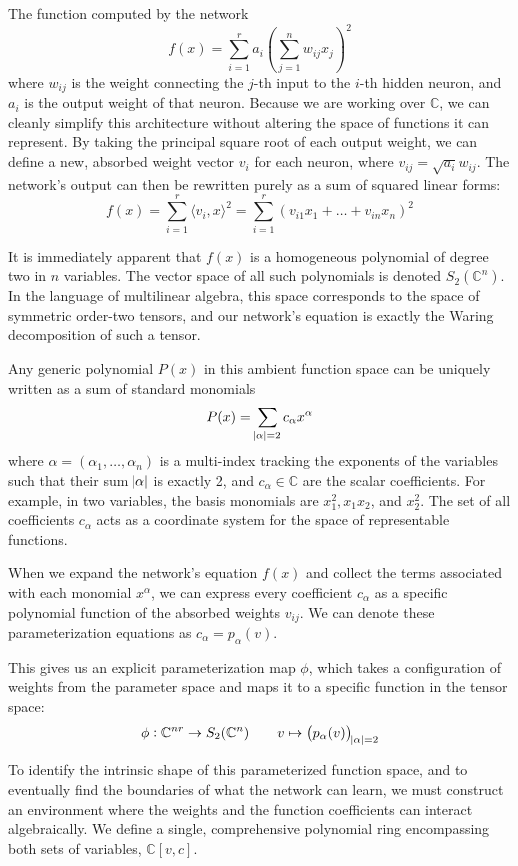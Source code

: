 \documentclass[12pt]{amsproc}
\renewcommand{\-}{\setminus}
\newcommand\<{\langle}
\renewcommand\>{\rangle}
\theoremstyle{plain}
\theoremstyle{definition}
\theoremstyle{remark}
\begin{document}
The function computed by the network
\[
f(x) = \sum_{i=1}^r a_i \left( \sum_{j=1}^n w_{ij} x_j \right)^2
\]
where $w_{ij}$ is the weight connecting the $j$-th input to the $i$-th hidden neuron, and $a_i$ is the output weight of that neuron. Because we are working over $\mathbb{C}$, we can cleanly simplify this architecture without altering the space of functions it can represent. By taking the principal square root of each output weight, we can define a new, absorbed weight vector $v_i$ for each neuron, where $v_{ij} = \sqrt{a_i} w_{ij}$. The network's output can then be rewritten purely as a sum of squared linear forms:
\[
f(x) = \sum_{i=1}^r \langle v_i, x \rangle^2 = \sum_{i=1}^r \left( v_{i1}x_1 + \dots + v_{in}x_n \right)^2
\]

It is immediately apparent that $f(x)$ is a homogeneous polynomial of degree two in $n$ variables. The vector space of all such polynomials is denoted $S_2(\mathbb{C}^n)$. In the language of multilinear algebra, this space corresponds to the space of symmetric order-two tensors, and our network's equation is exactly the Waring decomposition of such a tensor. 

Any generic polynomial $P(x)$ in this ambient function space can be uniquely written as a sum of standard monomials 
\[
P(x) = \sum_{\abs{\alpha} = 2} c_\alpha x^\alpha
\]
where $\alpha = (\alpha_1, \dots, \alpha_n)$ is a multi-index tracking the exponents of the variables such that their sum $\abs{\alpha}$ is exactly 2, and $c_\alpha \in \mathbb{C}$ are the scalar coefficients. For example, in two variables, the basis monomials are $x_1^2, x_1x_2$, and $x_2^2$. The set of all coefficients $c_\alpha$ acts as a coordinate system for the space of representable functions. 

When we expand the network's equation $f(x)$ and collect the terms associated with each monomial $x^\alpha$, we can express every coefficient $c_\alpha$ as a specific polynomial function of the absorbed weights $v_{ij}$. We can denote these parameterization equations as $c_\alpha = p_\alpha(v)$. 

This gives us an explicit parameterization map $\phi$, which takes a configuration of weights from the parameter space and maps it to a specific function in the tensor space:
\[
\phi: \mathbb{C}^{nr} \to S_2(\mathbb{C}^n) \qquad v \mapsto \left( p_\alpha(v) \right)_{\abs{\alpha}=2}
\]

To identify the intrinsic shape of this parameterized function space, and to eventually find the boundaries of what the network can learn, we must construct an environment where the weights and the function coefficients can interact algebraically. We define a single, comprehensive polynomial ring encompassing both sets of variables, $\mathbb{C}[v, c]$. 
\end{document}
